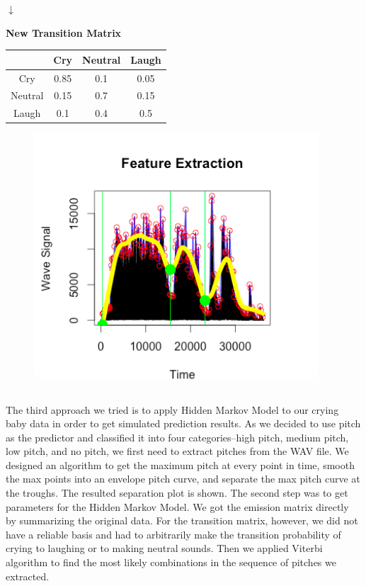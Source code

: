 \documentclass[paper=a4, fontsize=11pt]{scrartcl}
\numberwithin{equation}{section}
\numberwithin{figure}{section}
\numberwithin{table}{section}
\begin{document}
\centering $\downarrow$

\centering \textbf{New Transition Matrix}
\begin{center}
\begin{tabular}{ |c|c|c|c| } 
 \hline
       & Cry & Neutral & Laugh \\
 \hline
 Cry & 0.85 & 0.1 & 0.05 \\ 
 Neutral & 0.15 & 0.7 & 0.15 \\ 
 Laugh & 0.1 & 0.4 & 0.5 \\
 \hline
\end{tabular}
\end{center}

\begin{figure}
\begin{center}
\vspace{-15pt}
\includegraphics[width=.25\textwidth]{plot.png}
\end{center}
\vspace{-20pt}
\end{figure}

\paragraph{} The third approach we tried is to apply Hidden Markov Model to our crying baby data in order to get simulated prediction results. As we decided to use pitch as the predictor and classified it into four categories--high pitch, medium pitch, low pitch, and no pitch, we first need to extract pitches from the WAV file. We designed an algorithm to get the maximum pitch at every point in time, smooth the max points into an envelope pitch curve, and separate the max pitch curve at the troughs. The resulted separation plot is shown. The second step was to get parameters for the Hidden Markov Model. We got the emission matrix directly by summarizing the original data. For the transition matrix, however, we did not have a reliable basis and had to arbitrarily make the transition probability of crying to laughing or to making neutral sounds. Then we applied Viterbi algorithm to find the most likely combinations in the sequence of pitches we extracted.
\end{document}
